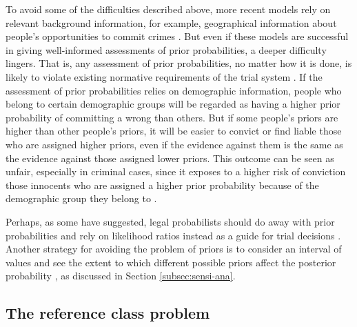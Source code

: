 \documentclass{article}
\begin{document}
 To avoid some of the difficulties described above, more recent models rely on relevant background information, for example, geographical information  about people's opportunities to commit crimes \citep{fenton2019OpportunityPriorProofbased}. 
 But even if these models are successful in giving well-informed assessments of prior probabilities, a deeper difficulty lingers. That is, any assessment of prior probabilities, no matter how it is done, is likely to violate existing normative requirements of the trial system \citep{dahlman2017, engel2012NeglectBaseRate,schweizer2013LawDoesnSay}. If the assessment of prior probabilities relies on demographic information, people who belong to certain demographic groups will be regarded as having a higher prior probability of committing a wrong than others. %
 But if 
 some people's priors are higher than other people's priors, 
 it will be easier to convict or find liable those who are assigned higher priors, even if the evidence against them is the same as the evidence against those assigned lower priors.
 This outcome can be seen as unfair, especially in criminal cases, since it exposes to a higher risk of conviction those innocents who are assigned a higher prior probability  because of the demographic group they belong to \citep{DiBelloONeil2020}. 
 
 Perhaps, as some have suggested, legal probabilists should do away with prior probabilities and rely on likelihood ratios instead as a guide for trial decisions  \citep{sullivan2016LikelihoodStoryTheory}. Another strategy for avoiding the problem of priors is to consider an interval of values and see the extent to which different possible priors affect the posterior probability \citep{Finkelstein1970A}, as discussed in Section \ref{subsec:sensi-ana}.
 





\subsection{The reference class problem}
\end{document}
